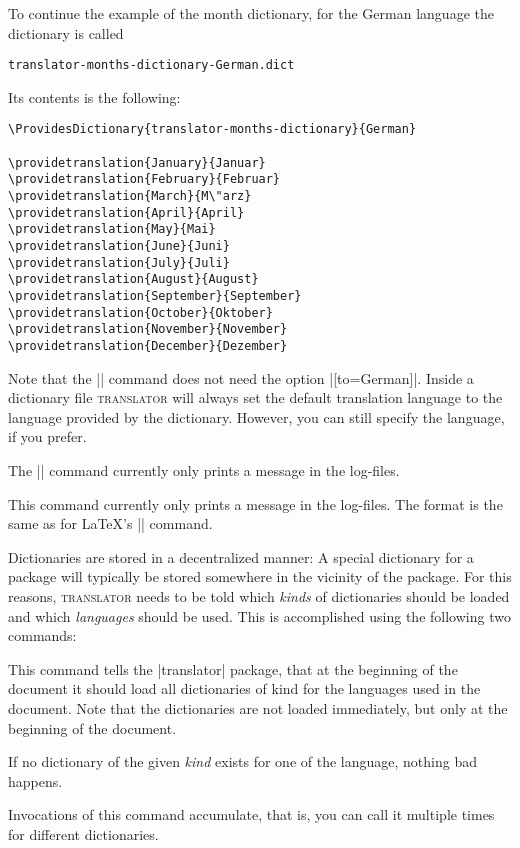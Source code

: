 To continue the example of the month dictionary, for the German language the dictionary is called
\begin{verbatim}
translator-months-dictionary-German.dict
\end{verbatim}
Its contents is the following:
\begin{verbatim}
\ProvidesDictionary{translator-months-dictionary}{German}

\providetranslation{January}{Januar}
\providetranslation{February}{Februar}
\providetranslation{March}{M\"arz}
\providetranslation{April}{April}
\providetranslation{May}{Mai}
\providetranslation{June}{Juni}
\providetranslation{July}{Juli}
\providetranslation{August}{August}
\providetranslation{September}{September}
\providetranslation{October}{Oktober}
\providetranslation{November}{November}
\providetranslation{December}{Dezember}
\end{verbatim}
Note that the |\providetranslation| command does not need the option |[to=German]|. Inside a dictionary file \textsc{translator} will always set the default translation language to the language provided by the dictionary. However, you can still specify the language, if you prefer. 

The |\ProvidesDictionary| command currently only prints a message in the log-files.

\begin{command}{\ProvidesDictionary{}}
  This command currently only prints a message in the log-files. The format is the same as for \LaTeX's |\ProvidesPackage| command.
\end{command}

Dictionaries are stored in a decentralized manner: A special dictionary for a package will typically be stored somewhere in the vicinity of the package. For this reasons, \textsc{translator} needs to be told which \emph{kinds} of dictionaries should be loaded and which \emph{languages}  should be used. This is accomplished using the following two commands:

\begin{command}{\usedictionary{}}
  This command tells the |translator| package, that at the beginning of the document it should load all dictionaries of kind  for the languages used in the document. Note that the dictionaries are not loaded immediately, but only at the beginning of the document.

  If no dictionary of the given \emph{kind} exists for one of the language, nothing bad happens.

  Invocations of this command accumulate, that is, you can call it multiple times for different dictionaries.
\end{command}

